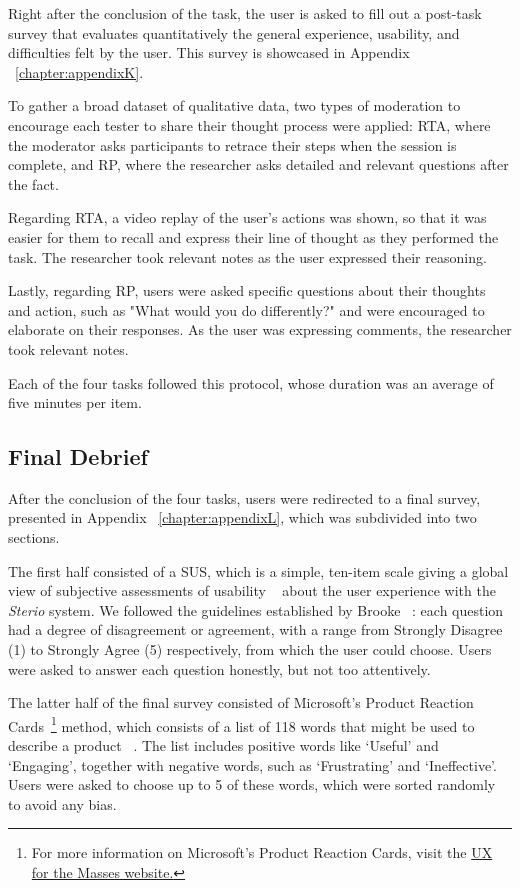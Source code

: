 Right after the conclusion of the task, the user is asked to fill out a post-task survey that evaluates quantitatively the general experience, usability, and difficulties felt by the user. This survey is showcased in Appendix ~\ref{chapter:appendixK}.

To gather a broad dataset of qualitative data, two types of moderation to encourage each tester to share their thought process were applied: \ac{RTA}, where the moderator asks participants to retrace their steps when the session is complete, and \ac{RP}, where the researcher asks detailed and relevant questions after the fact. ~\cite{Experience2011}

Regarding \ac{RTA}, a video replay of the user's actions was shown, so that it was easier for them to recall and express their line of thought as they performed the task. The researcher took relevant notes as the user expressed their reasoning.

Lastly, regarding \ac{RP}, users were asked specific questions about their thoughts and action, such as "What would you do differently?" and were encouraged to elaborate on their responses. As the user was expressing comments, the researcher took relevant notes.

Each of the four tasks followed this protocol, whose duration was an average of five minutes per item. 

\subsection{Final Debrief}
\label{sub:final}

After the conclusion of the four tasks, users were redirected to a final survey, presented in Appendix ~\ref{chapter:appendixL}, which was subdivided into two sections. 

The first half consisted of a \ac{SUS}, which is a simple, ten-item scale giving a global view of subjective assessments of usability ~\cite{Kusic2018} about the user experience with the \textit{Sterio} system. We followed the guidelines established by Brooke ~\cite{Kusic2018}: each question had a degree of disagreement or agreement, with a range from Strongly Disagree (1) to Strongly Agree (5) respectively, from which the user could choose. Users were asked to answer each question honestly, but not too attentively.

The latter half of the final survey consisted of Microsoft's Product Reaction Cards~\footnote{For more information on Microsoft's Product Reaction Cards, visit the \href{http://www.uxforthemasses.com/product-reaction-cards/}{UX for the Masses website.}} method, which consists of a list of 118 words that might be used to describe a product ~\cite{Experience2011}. The list includes positive words like ‘Useful’ and ‘Engaging’, together with negative words, such as ‘Frustrating’ and ‘Ineffective’. Users were asked to choose up to 5 of these words, which were sorted randomly to avoid any bias.

